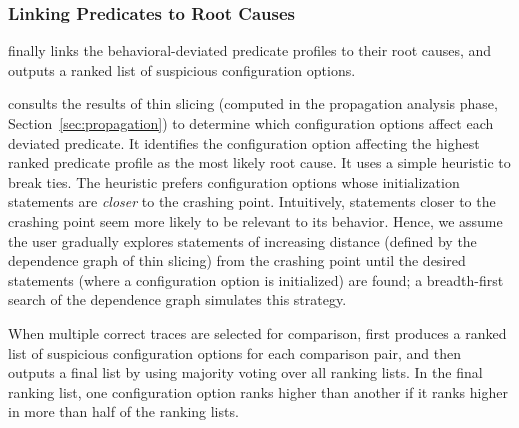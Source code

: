 \subsubsection{Linking Predicates to Root Causes}
\label{sec:linking}


\ourtool finally links the behavioral-deviated
predicate profiles to their root causes, and outputs a ranked list of suspicious
configuration options.

\ourtool consults the results of thin slicing (computed in the propagation
analysis phase, Section~\ref{sec:propagation}) to determine which
configuration options affect each deviated predicate.
It identifies the configuration option
affecting the highest ranked predicate profile as the most likely
root cause.  It uses a simple heuristic to break ties.
The heuristic prefers configuration options whose initialization
statements are \textit{closer} to the
crashing point. Intuitively, statements closer to the
crashing point seem more likely to be relevant to its behavior.
Hence, we assume the user gradually explores statements of
increasing distance (defined by the dependence graph of thin slicing)
from the crashing point until the desired statements (where a configuration
option is initialized) are found; a breadth-first
search of the dependence graph simulates this strategy.


When multiple correct traces are selected for comparison,
\ourtool first produces a ranked list of suspicious
configuration options for each comparison pair, and then outputs
a final list by using majority voting over all ranking lists.
In the final ranking list, one configuration option ranks higher
than another if it ranks higher in more than half of the ranking lists.


